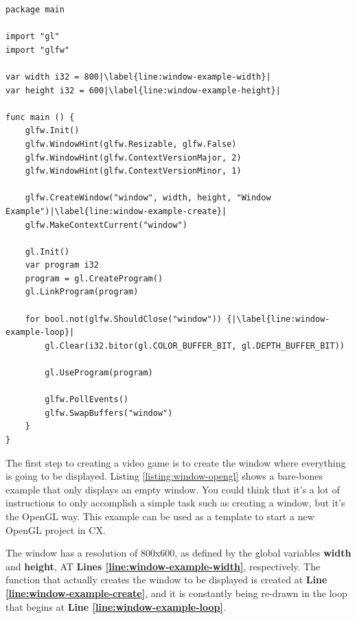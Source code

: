 \documentclass[11pt,fleqn,openany]{book} %
\begin{document}
\begin{lstlisting}[caption={Creating a Window using OpenGL},captionpos=b,label={listing:window-opengl}]
package main

import "gl"
import "glfw"

var width i32 = 800|\label{line:window-example-width}|
var height i32 = 600|\label{line:window-example-height}|

func main () {
	glfw.Init()
	glfw.WindowHint(glfw.Resizable, glfw.False)
	glfw.WindowHint(glfw.ContextVersionMajor, 2)
	glfw.WindowHint(glfw.ContextVersionMinor, 1)

	glfw.CreateWindow("window", width, height, "Window Example")|\label{line:window-example-create}|
	glfw.MakeContextCurrent("window")
	
	gl.Init()
	var program i32
	program = gl.CreateProgram()
	gl.LinkProgram(program)
	
	for bool.not(glfw.ShouldClose("window")) {|\label{line:window-example-loop}|
		gl.Clear(i32.bitor(gl.COLOR_BUFFER_BIT, gl.DEPTH_BUFFER_BIT))

		gl.UseProgram(program)

		glfw.PollEvents()
		glfw.SwapBuffers("window")
	}
}
\end{lstlisting}

The first step to creating a video game is to create the window where everything is going to be displayed. Listing \ref{listing:window-opengl} shows a bare-bones example that only displays an empty window. You could think that it's a lot of instructions to only accomplish a simple task such as creating a window, but it's the OpenGL way. This example can be used as a template to start a new OpenGL project in CX.

The window has a resolution of 800x600, as defined by the global variables \textbf{width} and \textbf{height}, AT \textbf{Lines \ref{line:window-example-width}}, respectively. The function that actually creates the window to be displayed is created at \textbf{Line \ref{line:window-example-create}}, and it is constantly being re-drawn in the loop that begins at \textbf{Line \ref{line:window-example-loop}}.
\end{document}
